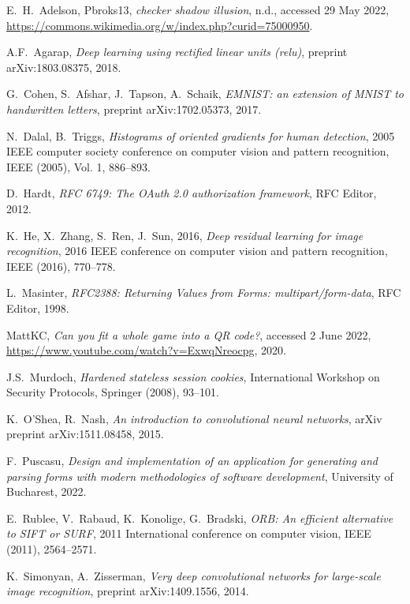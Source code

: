 \documentclass[11pt, a4paper]{report}
\begin{document}
\begin{thebibliography}{99}	

E.~H.~Adelson, Pbroks13, \emph{checker shadow illusion}, n.d., accessed 29 May 2022, \url{https://commons.wikimedia.org/w/index.php?curid=75000950}.

A.F.~Agarap,
\emph{Deep learning using rectified linear units (relu)}, preprint arXiv:1803.08375, 2018.

G.~Cohen, S.~Afshar, J.~Tapson, A.~Schaik,
\emph{EMNIST: an extension of MNIST to handwritten letters}, preprint arXiv:1702.05373, 2017.

N.~Dalal, B.~Triggs,
\emph{Histograms of oriented gradients for human detection},
2005 IEEE computer society conference on computer vision and pattern recognition, IEEE (2005), Vol. 1, 886--893.

D.~Hardt,
\emph{RFC 6749: The OAuth 2.0 authorization framework}, RFC Editor, 2012.

K.~He, X.~Zhang, S.~Ren, J.~Sun, 2016,
\emph{Deep residual learning for image recognition},
2016 IEEE conference on computer vision and pattern recognition, IEEE (2016), 770--778.

L.~Masinter, 
\emph{RFC2388: Returning Values from Forms: multipart/form-data},
RFC Editor, 1998.

MattKC, \emph{Can you fit a whole game into a QR code?}, accessed 2 June 2022, \url{https://www.youtube.com/watch?v=ExwqNreocpg}, 2020.

J.S.~Murdoch,
\emph{Hardened stateless session cookies},
International Workshop on Security Protocols, Springer (2008),  93--101.

K.~O'Shea, R.~Nash,
\emph{An introduction to convolutional neural networks}, arXiv preprint
arXiv:1511.08458, 2015.

F.~Puscasu, \emph{Design and implementation of an application for generating and parsing forms with modern methodologies of software development},
University of Bucharest, 2022.

E.~Rublee, V.~Rabaud, K.~Konolige, G.~Bradski,
\emph{ORB: An efficient alternative to SIFT or SURF},
2011 International conference on computer vision, IEEE (2011),
2564--2571.

K.~Simonyan, A.~Zisserman,
\emph{Very deep convolutional networks for large-scale image recognition}, preprint arXiv:1409.1556, 2014.


\end{thebibliography}
\end{document}
